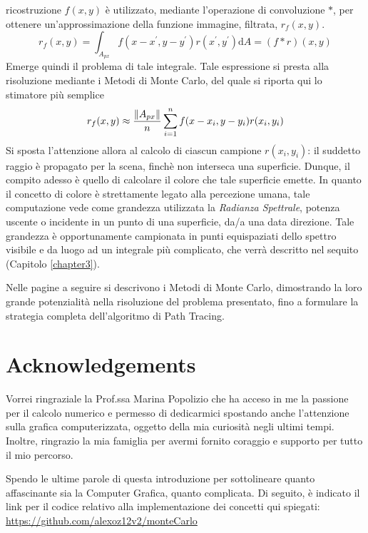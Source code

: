 \documentclass[10pt, openany]{book}
\theoremstyle{theoremdd}
\begin{document}
	ricostruzione $f(x,y)$ \`e utilizzato, mediante l'operazione di convoluzione $*$, per ottenere un'approssimazione della funzione immagine, filtrata,
	$r_f(x,y)$.
	\begin{equation}
		r_f(x,y)=\int_{A_{px}}f(x-x^\prime,y-y^\prime)r(x^\prime,y^\prime)\mathrm{d}A = (f*r)(x,y)
	\end{equation}
	Emerge quindi il problema di tale integrale. Tale espressione si presta alla risoluzione mediante i Metodi di Monte Carlo, del quale si 
	riporta qui lo stimatore pi\`u semplice
	\begin{equation}
		r_f(x,y)\approx\frac{\norm{A_{px}}}{n}\sum_{i=1}^{n}f(x-x_i,y-y_i)r(x_i,y_i)
	\end{equation}
	Si sposta l'attenzione allora al calcolo di ciascun campione $r(x_i,y_i)$: il suddetto raggio \`e propagato per la scena, 
	finch\`e non interseca una superficie.
	Dunque, il compito adesso \`e quello di calcolare il colore che tale superficie emette. In quanto il concetto di colore \`e strettamente legato 
	alla percezione umana, tale computazione vede come grandezza utilizzata la \textit{Radianza Spettrale}, potenza uscente o incidente in un punto di 
	una superficie, da/a una data direzione. Tale grandezza \`e opportunamente campionata in punti equispaziati dello spettro visibile	
	e da luogo ad un integrale pi\`u complicato, che verr\`a descritto nel sequito (Capitolo \ref{chapter3}).\par
	Nelle pagine a seguire si descrivono i Metodi di Monte Carlo, dimostrando la loro grande potenzialit\`a nella risoluzione del problema 
	presentato, fino a formulare la strategia completa dell'algoritmo di Path Tracing.

	\section*{Acknowledgements}
	Vorrei ringraziale la Prof.ssa Marina Popolizio che ha acceso in me la passione per il calcolo numerico e permesso di dedicarmici spostando anche 
	l'attenzione sulla grafica computerizzata, oggetto della mia curiosit\`a negli ultimi tempi. Inoltre, ringrazio la mia famiglia per avermi fornito
	coraggio e supporto per tutto il mio percorso.\par
	Spendo le ultime parole di questa introduzione per sottolineare quanto affascinante sia la Computer Grafica, quanto complicata. Di seguito, \`e 
	indicato il link per il codice relativo alla implementazione dei concetti qui spiegati:\\
	\href{https://github.com/alexoz12v2/monteCarlo}{https://github.com/alexoz12v2/monteCarlo}
\end{document}
